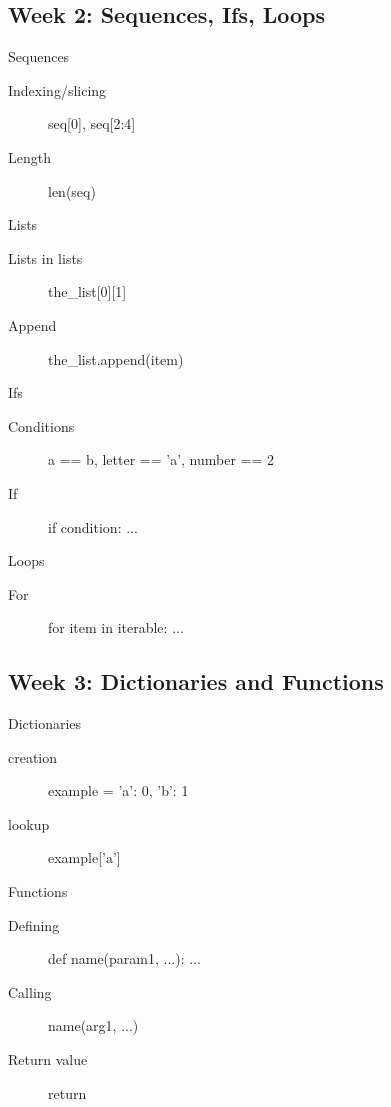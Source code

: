 \documentclass[aspectratio=169,usenames,dvipsnames]{beamer}
\begin{document}
\subsection{Week 2: Sequences, Ifs, Loops}
\begin{frame}[fragile]{Sequences}
    \begin{description}
        \item[Indexing/slicing] seq[0], seq[2:4]
        \item[Length] len(seq)
    \end{description}
\end{frame}
\begin{frame}[fragile]{Lists}
    \begin{description}
        \item[Lists in lists] the\_list[0][1]
        \item[Append] the\_list.append(item)
    \end{description}
\end{frame}
\begin{frame}[fragile]{Ifs}
    \begin{description}
        \item[Conditions] a == b, letter == 'a', number == 2
        \item[If] if condition: ...
    \end{description}
\end{frame}
\begin{frame}[fragile]{Loops}
    \begin{description}
        \item[For] for item in iterable: ...
    \end{description}
\end{frame}

\subsection{Week 3: Dictionaries and Functions}
\begin{frame}[fragile]{Dictionaries}
    \begin{description}
        \item[creation] example = {'a': 0, 'b': 1}
        \item[lookup] example['a']
    \end{description}
\end{frame}
\begin{frame}[fragile]{Functions}
    \begin{description}
        \item[Defining] def name(param1, ...): ...
        \item[Calling] name(arg1, ...)
        \item[Return value] return
    \end{description}
\end{frame}
\end{document}
